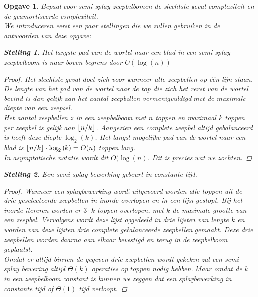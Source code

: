 \documentclass[12pt,hidelinks]{article}
\DeclarePairedDelimiter\floor{\lfloor}{\rfloor}
\newtheorem{opgave}{Opgave}
\newtheorem{stelling}{Stelling}
\newcommand{\newln}{~\\\vspace{0.5em}}
\begin{document}
    \begin{opgave}
        Bepaal voor semi-splay zeepbelbomen de slechtste-geval complexiteit en de geamortiseerde complexiteit.
        \newln \normalfont 
        We introduceren eerst een paar stellingen die we zullen gebruiken in de antwoorden van deze opgave:
        \begin{stelling}Het langste pad van de wortel naar een blad in een semi-splay zeepbelboom is naar boven begrens door $O(\log(n))$ \label{stelling1}
            \begin{proof}Het slechtste geval doet zich voor wanneer alle zeepbellen op één lijn staan.
                De lengte van het pad van de wortel naar de top die zich het verst van de wortel bevind is dan gelijk aan het aantal zeepbellen vermenigvuldigd met de maximale diepte van een zeepbel.
                \newln
                Het aantal zeepbellen $z$ in een zeepbelboom met $n$ toppen en maximaal $k$ toppen per zeepbel is gelijk aan $\floor{n/k}$.
                Aangezien een complete zeepbel altijd gebalanceerd is heeft deze diepte $\log_2{(k)}$. 
                Het langst mogelijke pad van de wortel naar een blad is $\floor{n/k}\cdot\log_2{(k)} = O(n)$ toppen lang.
                \\
                In asymptotische notatie wordt dit $O(\log(n)$. Dit is precies wat we zochten.
            \end{proof}
        \end{stelling}
        \begin{stelling} Een semi-splay bewerking gebeurt in constante tijd. \label{stelling2}
            \begin{proof}
                Wanneer een splaybewerking wordt uitgevoerd worden alle toppen uit de drie geselecteerde zeepbellen in inorde overlopen en in een lijst gestopt.
                Bij het inorde itereren worden er $3\cdot k$ toppen overlopen, met $k$ de maximale grootte van een zeepbel.
                Vervolgens wordt deze lijst opgedeeld in drie lijsten van lengte $k$ en worden van deze lijsten drie complete gebalanceerde zeepbellen gemaakt.
                Deze drie zeepbellen worden daarna aan elkaar bevestigd en terug in de zeepbelboom geplaatst.
                \newln
                Omdat er altijd binnen de gegeven drie zeepbellen wordt gekeken zal een semi-splay bewering altijd $\Theta(k)$ operaties op toppen nodig hebben.
                Maar omdat de $k$ in een zeepbelboom constant is kunnen we zeggen dat een splaybewerking in constante tijd of $\Theta(1)$ tijd verloopt.

\end{proof}
\end{stelling}
\end{opgave}
\end{document}
